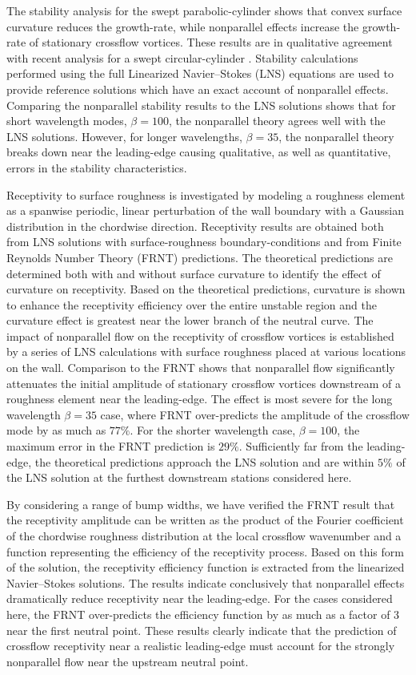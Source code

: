 The stability analysis for the swept parabolic-cylinder shows that convex
surface curvature reduces the growth-rate, while nonparallel effects increase
the growth-rate of stationary crossflow vortices.  These results are in
qualitative agreement with recent analysis for a swept circular-cylinder
\cite{MaMa:94}.  Stability calculations performed using the full Linearized
Navier--Stokes (LNS) equations are used to provide reference solutions which
have an exact account of nonparallel effects.  Comparing the nonparallel
stability results to the LNS solutions shows that for short wavelength modes,
$\beta=100$, the nonparallel theory agrees well with the LNS solutions.
However, for longer wavelengths, $\beta=35$, the nonparallel theory breaks
down near the leading-edge causing qualitative, as well as quantitative,
errors in the stability characteristics.

Receptivity to surface roughness is investigated by modeling a roughness
element as a spanwise periodic, linear perturbation of the wall boundary with
a Gaussian distribution in the chordwise direction.  Receptivity results are
obtained both from LNS solutions with surface-roughness boundary-conditions
and from Finite Reynolds Number Theory (FRNT) predictions.  The theoretical
predictions are determined both with and without surface curvature to identify
the effect of curvature on receptivity.  Based on the theoretical predictions,
curvature is shown to enhance the receptivity efficiency over the entire
unstable region and the curvature effect is greatest near the lower branch of
the neutral curve.  The impact of nonparallel flow on the receptivity of
crossflow vortices is established by a series of LNS calculations with surface
roughness placed at various locations on the wall.  Comparison to the FRNT
shows that nonparallel flow significantly attenuates the initial amplitude of
stationary crossflow vortices downstream of a roughness element near the
leading-edge.  The effect is most severe for the long wavelength $\beta=35$
case, where FRNT over-predicts the amplitude of the crossflow mode by as much
as $77\%$.  For the shorter wavelength case, $\beta=100$, the maximum error in
the FRNT prediction is $29\%$.  Sufficiently far from the leading-edge, the
theoretical predictions approach the LNS solution and are within $5\%$ of the
LNS solution at the furthest downstream stations considered here.

By considering a range of bump widths, we have verified the FRNT result that
the receptivity amplitude can be written as the product of the Fourier
coefficient of the chordwise roughness distribution at the local crossflow
wavenumber and a function representing the efficiency of the receptivity
process.  Based on this form of the solution, the receptivity efficiency
function is extracted from the linearized Navier--Stokes solutions.  The
results indicate conclusively that nonparallel effects dramatically reduce
receptivity near the leading-edge.  For the cases considered here, the FRNT
over-predicts the efficiency function by as much as a factor of 3 near the
first neutral point.  These results clearly indicate that the prediction of
crossflow receptivity near a realistic leading-edge must account for the
strongly nonparallel flow near the upstream neutral point.

